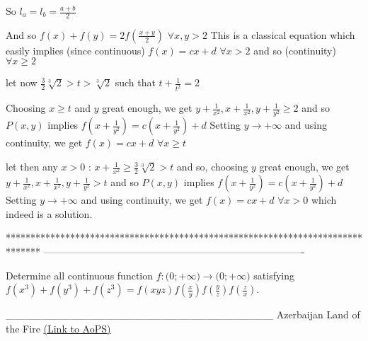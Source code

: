 \begin{solution}
So $l_a=l_b=\frac{a+b}2$

And so $f(x)+f(y)=2f(\frac{x+y}2)$ $\forall x,y>2$
This is a classical equation which easily implies (since continuous) $f(x)=cx+d$ $\forall x>2$ and so (continuity) $\forall x\ge 2$

let now $\frac 32\sqrt[3]2>t>\sqrt[3]2$ such that $t+\frac 1{t^2}=2$

Choosing $x\ge t$ and $y$ great enough, we get $y+\frac 1{x^2}, x+\frac 1{x^2}, y+\frac 1{y^2}\ge 2$ and so $P(x,y)$ implies $f(x+\frac 1{y^2})=c(x+\frac 1{y^2})+d$
Setting $y\to+\infty$ and using continuity, we get $f(x)=cx+d$ $\forall x\ge t$

let then any $x>0$ : $x+\frac 1{x^2}\ge \frac 32\sqrt[3]2>t$ and so, choosing $y$ great enough, we get $y+\frac 1{x^2}, x+\frac 1{x^2}, y+\frac 1{y^2}> t$ and so $P(x,y)$ implies $f(x+\frac 1{y^2})=c(x+\frac 1{y^2})+d$
Setting $y\to+\infty$ and using continuity, we get $\boxed{f(x)=cx+d}$ $\forall x>0$ which indeed is a solution.
\end{solution}
*******************************************************************************
-------------------------------------------------------------------------------

\begin{problem}
	Determine all continuous function ${{f: \mathbb(0;+\infty)}\to\mathbb(0;+\infty)}$ satisfying $f(x^3)+f(y^3)+f(z^3)=f(xyz)f(\frac{x}{y})f(\frac{y}{z})f(\frac{z}{x})$.


____________________________________
Azerbaijan Land of the Fire 
	\flushright \href{https://artofproblemsolving.com/community/c6h531784}{(Link to AoPS)}
\end{problem}



